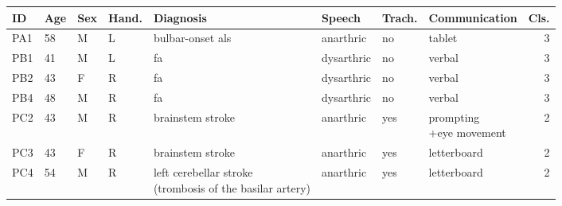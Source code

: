 \begin{tabular}{llllllllr}
  \toprule
  \textbf{ID}  & \textbf{Age} & \textbf{Sex} & \textbf{Hand.} &
  \textbf{Diagnosis}
  & \textbf{Speech}     & \textbf{Trach.} & \textbf{Communication}          &
  \textbf{Cls.} \\ \midrule
  PA1 & 58  & M   & L     & bulbar-onset \acs{als} & anarthric  & no          & tablet                 & 3  \\
  PB1 & 41  & M   & L     & \acs{fa} & dysarthric & no          & verbal                 & 3  \\
  PB2 & 43  & F   & R     & \acs{fa} & dysarthric & no          & verbal                 & 3  \\
  PB4 & 48  & M   & R     & \acs{fa} & dysarthric & no          & verbal                 & 3  \\
  PC2 & 43  & M   & R     & brainstem stroke & anarthric  & yes         & \makecell[l]{prompting\\+eye movement} & 2 \\
  PC3 & 43  & F   & R     & brainstem stroke & anarthric  & yes         & letterboard            & 2 \\
  PC4 & 54  & M   & R     & \makecell[l]{left cerebellar stroke \\ (trombosis of the basilar artery)} & anarthric  & yes & letterboard & 2 \\
  \bottomrule
\end{tabular}
